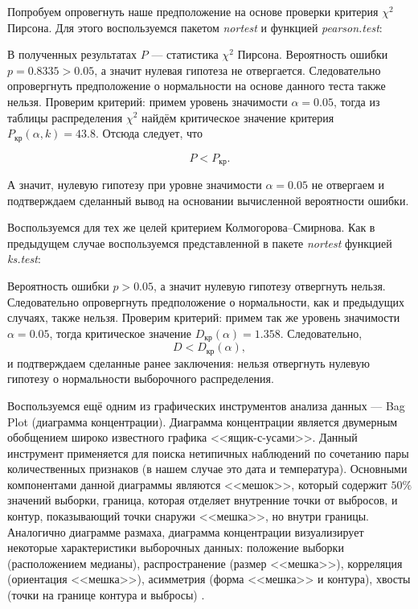 Попробуем опровегнуть наше предположение на основе проверки критерия $\chi^2$ Пирсона. Для этого воспользуемся пакетом \textit{nortest} и функцией \textit{pearson.test}:

В полученных результатах $P$ --- статистика $\chi^2$ Пирсона. Вероятность ошибки $p = 0.8335 > 0.05$, а значит нулевая гипотеза не отвергается. Следовательно опровергнуть предположение о нормальности на основе данного теста также нельзя. Проверим критерий: примем уровень значимости $\alpha = 0.05$, тогда из таблицы распределения $\chi^2$ найдём критическое значение критерия $P_{\textrm{кр}}(\alpha, k) = 43.8$. Отсюда следует, что

\begin{equation*}
	P < P_{\textrm{кр}}.
\end{equation*}

А значит, нулевую гипотезу при уровне значимости $\alpha = 0.05$ не отвергаем и подтверждаем сделанный вывод на основании вычисленной вероятности ошибки. 

Воспользуемся для тех же целей критерием Колмогорова--Смирнова. Как в предыдущем случае воспользуемся представленной в пакете \textit{nortest} функцией \textit{ks.test}:

Вероятность ошибки $p > 0.05$, а значит нулевую гипотезу отвергнуть нельзя. Следовательно опровергнуть предположение о нормальности, как и предыдущих случаях, также нельзя. Проверим критерий: примем так же уровень значимости $\alpha = 0.05$, тогда критическое значение $D_{\textrm{кр}}(\alpha) = 1.358$. Следовательно,
\begin{equation*}
	D < D_{\textrm{кр}}(\alpha),
\end{equation*}
и подтверждаем сделанные ранее заключения: нельзя отвергнуть нулевую гипотезу о нормальности выборочного распределения.

Воспользуемся ещё одним из графических инструментов анализа данных --- Bag Plot (диаграмма концентрации). 
Диаграмма концентрации является двумерным обобщением широко известного графика <<ящик-с-усами>>. Данный инструмент применяется для поиска нетипичных наблюдений по сочетанию пары количественных признаков (в нашем случае это дата и температура). Основными компонентами данной диаграммы являются <<мешок>>, который содержит $50\%$ значений выборки, граница, которая отделяет внутренние точки от выбросов, и контур, показывающий точки снаружи <<мешка>>, но внутри границы. Аналогично диаграмме размаха, диаграмма концентрации визуализирует некоторые характеристики выборочных данных: положение выборки (расположением медианы), распространение (размер <<мешка>>), корреляция (ориентация <<мешка>>), асимметрия (форма <<мешка>> и контура), хвосты (точки на границе контура и выбросы) \cite{Rousseeuw1999Bagplot}.

